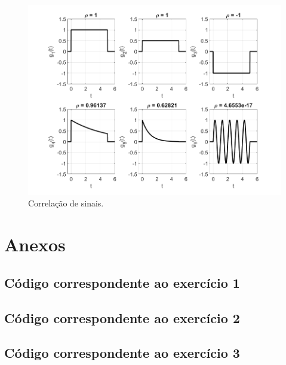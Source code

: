 \documentclass[a4paper,12pt,oneside,openany,table,xcdraw]{article}
\begin{document}
\vspace{0.4cm}
\begin{figure}[H]
\centering
\includegraphics[width=16cm]{ex4-corr}
\caption{Correlação de sinais.}
\label{ex4:corr}
\end{figure}
 
\newpage
\section{Anexos}
\subsection{Código correspondente ao exercício 1} \label{anexo:ex1}

\vspace{0.3cm}


\vspace{0.3cm}


\vspace{0.3cm}



\vspace{0.3cm}
\subsection{Código correspondente ao exercício 2} \label{anexo:ex2}


\vspace{0.3cm}
\subsection{Código correspondente ao exercício 3} \label{anexo:ex3}

\vspace{0.3cm}
\end{document}
